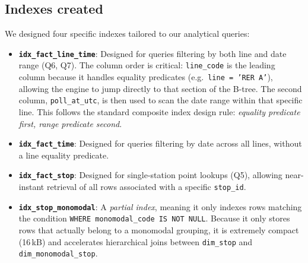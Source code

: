 \documentclass[a4paper,11pt]{article}
\begin{document}
\subsection{Indexes created}

\begin{table}[H]
\centering
\small
{}%
\caption{B-tree indexes on the \texttt{core} schema.}
\label{tab:indexes}
\end{table}

We designed four specific indexes tailored to our analytical queries:
\begin{itemize}
  \item \textbf{\texttt{idx\_fact\_line\_time}}: Designed for queries filtering by both line and date range (Q6, Q7). The column order is critical: \texttt{line\_code} is the leading column because it handles equality predicates (e.g.\ \texttt{line = 'RER A'}), allowing the engine to jump directly to that section of the B-tree. The second column, \texttt{poll\_at\_utc}, is then used to scan the date range within that specific line. This follows the standard composite index design rule: \emph{equality predicate first, range predicate second}.
  \item \textbf{\texttt{idx\_fact\_time}}: Designed for queries filtering by date across all lines, without a line equality predicate.
  \item \textbf{\texttt{idx\_fact\_stop}}: Designed for single-station point lookups (Q5), allowing near-instant retrieval of all rows associated with a specific \texttt{stop\_id}.
  \item \textbf{\texttt{idx\_stop\_monomodal}}: A \emph{partial index}, meaning it only indexes rows matching the condition \texttt{WHERE monomodal\_code IS NOT NULL}. Because it only stores rows that actually belong to a monomodal grouping, it is extremely compact (16\,kB) and accelerates hierarchical joins between \texttt{dim\_stop} and \texttt{dim\_monomodal\_stop}.
\end{itemize}
\end{document}
